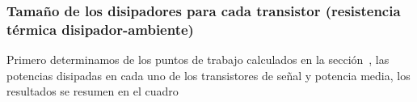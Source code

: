 \vspace{1.5cm}

\subsubsection{Tamaño de los disipadores para cada transistor (resistencia térmica disipador-ambiente)}
\label{thermal_calculation}

Primero determinamos de los puntos de trabajo calculados en la sección~, las potencias disipadas en cada uno de los transistores de señal y potencia media, los resultados se resumen en el cuadro~


 
